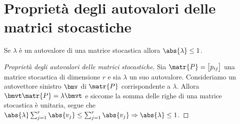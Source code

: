 \documentclass[\main/main.tex]{subfiles}
\begin{document}
\section{Proprietà degli autovalori delle matrici stocastiche}
\begin{theorem}
  Se \(\lambda \) è un autovalore di una matrice stocastica allora \(\abs{\lambda} \leq 1\).
\end{theorem}
\begin{proof}[Proprietà degli autovalori delle matrici stocastiche]
  Sia \(\matr{P} = \begin{bmatrix}
    p_{ij}
  \end{bmatrix}\) una matrice stocastica di dimensione \(r\) e sia \(\lambda \) un suo autovalore. Consideriamo un autovettore sinistro \(\bmv \) di \(\matr{P}\) corrispondente a \(\lambda \). Allora \(\bmvt\matr{P} = \lambda\bmvt \) e siccome la somma delle righe di una matrice stocastica è unitaria, segue che \(\abs{\lambda}\sum_{j=1}^r \abs{v_j} \leq \sum_{j=1}^r \abs{v_j} \Rightarrow \abs{\lambda} \leq 1\).
\end{proof}
\end{document}
